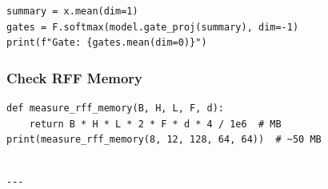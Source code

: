 \begin{lstlisting}
summary = x.mean(dim=1)
gates = F.softmax(model.gate_proj(summary), dim=-1)
print(f"Gate: {gates.mean(dim=0)}")
\end{lstlisting}

\subsubsection{Check RFF Memory}

\begin{lstlisting}
def measure_rff_memory(B, H, L, F, d):
    return B * H * L * 2 * F * d * 4 / 1e6  # MB
print(measure_rff_memory(8, 12, 128, 64, 64))  # ~50 MB
\end{lstlisting}
\begin{lstlisting}

---
\end{lstlisting}
